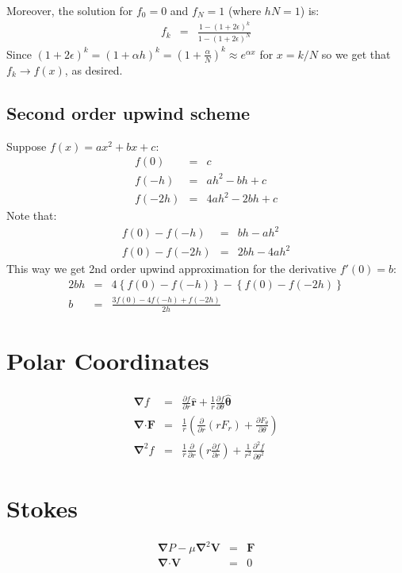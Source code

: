 \documentclass[11pt]{article}
\newcommand\eps \epsilon
\providecommand\bnabla{\boldsymbol{\nabla}}
\providecommand\bcdot{\boldsymbol{\cdot}}
\begin{document}
Moreover, the solution for $f_0 = 0$ and $f_N = 1$ (where $h N = 1$) is:
\begin{eqnarray}
f_k &=& \frac{1 - (1+2\eps)^k}{1 - (1+2\eps)^N}
\end{eqnarray}
Since $(1+2\eps)^k = (1+\alpha h)^k = \left(1 + \frac{\alpha}{N}\right)^k \approx e^{\alpha x}$ for $x = k/N$
so we get that $f_k \rightarrow f(x)$, as desired.
\subsection{Second order upwind scheme}
Suppose $f(x) = ax^2 + bx + c$:
\begin{eqnarray}
  f(0) &=& c \\
  f(-h) &=& ah^2 - bh + c \\
  f(-2h) &=& 4ah^2 - 2bh + c
\end{eqnarray}
Note that:
\begin{eqnarray}
  f(0) - f(-h) &=& bh - ah^2 \\
  f(0) - f(-2h) &=& 2bh - 4ah^2
\end{eqnarray}
This way we get 2nd order upwind approximation for the derivative $f'(0) = b$:
\begin{eqnarray}
  2bh &=& 4\left\{f(0) - f(-h)\right\} - \left\{f(0) - f(-2h)\right\} \\
  b &=& \frac{3f(0) - 4f(-h) + f(-2h)}{2h}
\end{eqnarray}

\section{Polar Coordinates}
\begin{eqnarray}
\bnabla f &=& \frac{\partial f}{\partial r} \mathbf{\hat{r}} +
\frac{1}{r} \frac{\partial f}{\partial \theta} \mathbf{\hat{\theta}}
\\
\bnabla \mathbf{\cdot} \mathbf{F} &=& \frac{1}{r}
\left(
\frac{\partial}{\partial r} (r F_r) +
\frac{\partial F_\theta}{\partial \theta}
\right)
\\
\bnabla^2 f &=& \frac{1}{r}\frac{\partial}{\partial r}
\left( r \frac{\partial f}{\partial r} \right) +
\frac{1}{r^2}\frac{\partial^2 f}{\partial \theta^2}
\end{eqnarray}

\section{Stokes}
\begin{eqnarray}
 \bnabla P - \mu \bnabla^2 \mathbf{V} &=& \mathbf{F} \\
 \bnabla \bcdot \mathbf{V} &=& 0
\end{eqnarray}
\end{document}

